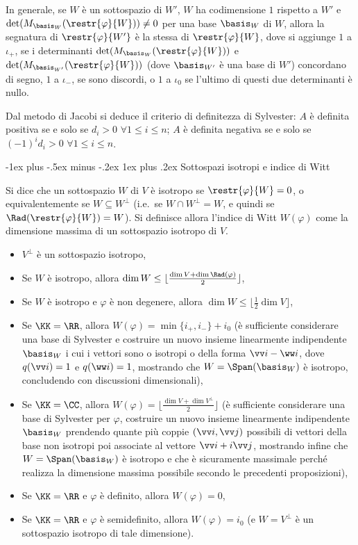\documentclass[10pt,landscape]{article}
\makeatletter
\renewcommand{\subsubsection}{\@startsection{subsubsection}{3}{0mm}%
	{-1ex plus -.5ex minus -.2ex}%
	{1ex plus .2ex}%
	{\normalfont\small\bfseries}}
\makeatother
\begin{document}
\begin{multicols}{3}
		In generale, se $W$ è un sottospazio di $W'$, $W$ ha codimensione $1$ rispetto a $W'$ e $\det(M_{\basis_W}(\restr{\varphi}{W})) \neq 0$ per una base $\basis_W$ di $W$, allora la segnatura
		di $\restr{\varphi}{W'}$ è la stessa di $\restr{\varphi}{W}$, dove si aggiunge
		$1$ a $\iota_+$, se i determinanti $\det(M_{\basis_W}(\restr{\varphi}{W}))$ e $\det(M_{\basis_{W'}}(\restr{\varphi}{W}))$ (dove $\basis_{W'}$ è una base di $W'$) concordano di segno, $1$ a $\iota_-$, se
		sono discordi, o $1$ a $\iota_0$ se l'ultimo di questi due determinanti è nullo.
		
		Dal metodo di Jacobi si deduce il criterio di definitezza di Sylvester: $A$ è
		definita positiva se e solo se $d_i > 0$ $\forall 1 \leq i \leq n$; $A$ è
		definita negativa se e solo se $(-1)^i d_i > 0$ $\forall 1 \leq i \leq n$.
		
		\subsubsection{Sottospazi isotropi e indice di Witt}
		
		Si dice che un sottospazio $W$ di $V$ è isotropo se $\restr{\varphi}{W} = 0$, o
		equivalentemente se $W \subseteq W^\perp$ (i.e.~se $W \cap W^\perp = W$, e quindi
		se $\Rad(\restr{\varphi}{W}) = W$). Si definisce allora l'indice di Witt $W(\varphi)$ come
		la dimensione massima di un sottospazio isotropo di $V$.
		
		\begin{itemize}
			\item $V^\perp$ è un sottospazio isotropo,
			\item Se $W$ è isotropo, allora $\dim W \leq  \lfloor \frac{\dim V + \dim \Rad(\varphi)}{2} \rfloor$,
			\item Se $W$ è isotropo e $\varphi$ è non degenere, allora $\dim W \leq \lfloor \frac{1}{2} \dim V \rfloor$,
			\item Se $\KK = \RR$, allora $W(\varphi) = \min\{ i_+, i_- \} + i_0$ (è sufficiente considerare
			una base di Sylvester e costruire un nuovo insieme linearmente indipendente $\basis_W$ i cui i vettori sono o isotropi o della forma $\vv i - \ww i$, dove $q(\vv i) = 1$ e $q(\ww i) = 1$, mostrando che $W = \Span(\basis_W)$ è isotropo, concludendo con discussioni dimensionali),
			\item Se $\KK = \CC$, allora $W(\varphi) = \lfloor \frac{\dim V + \dim V^\perp}{2} \rfloor$ (è sufficiente considerare una base di Sylvester per $\varphi$, costruire un nuovo insieme linearmente indipendente $\basis_W$ prendendo quante più coppie $(\vv i, \vv j)$ possibili di vettori della base non isotropi poi associate al vettore $\vv i + i \vv j$, mostrando infine che $W = \Span(\basis_W)$ è isotropo e che è sicuramente massimale perché realizza la dimensione massima possibile secondo le precedenti proposizioni),
			\item Se $\KK=\RR$ e $\varphi$ è definito, allora $W(\varphi) = 0$,
			\item Se $\KK=\RR$ e $\varphi$ è semidefinito, allora $W(\varphi) = i_0$ (e $W = V^\perp$ è un sottospazio
			isotropo di tale dimensione).
		\end{itemize}
		

\end{multicols}
\end{document}
